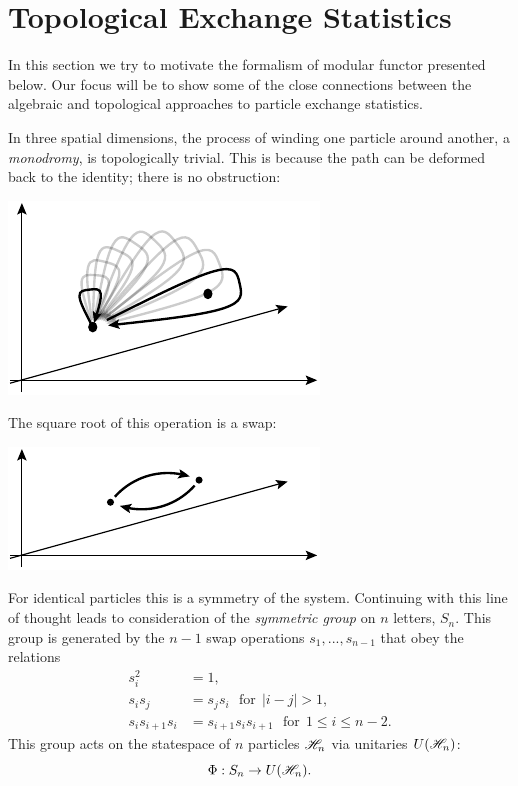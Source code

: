 \documentclass[aps, prl, letterpaper, twocolumn, superscriptaddress, notitlepage, 10pt]{revtex4-1}
\begin{document}

%
%

\section{Topological Exchange Statistics}

In this section we try to motivate 
the formalism of modular functor presented
below.
Our focus will be to show some of the close connections between
the algebraic and topological approaches to
particle exchange statistics.

In three spatial dimensions, the process of winding one
particle around another, a \emph{monodromy}, is topologically trivial.
This is because the path can be deformed back to the
identity; there is no obstruction:
\begin{center}
\includegraphics[]{pic-monodromy3d.pdf}
\end{center}
The square root of this operation is a swap:
\begin{center}
\includegraphics[]{pic-swap.pdf}
\end{center}
For identical particles this is a symmetry of the system.
Continuing with this line of thought 
leads to consideration of the \emph{symmetric group}
on $n$ letters, $S_n$. 
This group is generated by the $n-1$ swap operations
$s_1,...,s_{n-1}$ that obey the relations
\begin{align*}
    s_i^2 &= 1, \\
    s_i s_j &= s_j s_i \ \ \ \mbox{for}\ \ |i-j|>1,\\
    s_i s_{i+1} s_i &= s_{i+1} s_i s_{i+1} \ \ \ \mbox{for}\ \ 1\le i \le n-2.
\end{align*}
This group acts on the statespace of $n$ particles $\mathscr{H}_n$
via unitaries $U(\mathscr{H}_n)$:
$$
    \Phi : S_n \to U(\mathscr{H}_n).
$$
\end{document}
